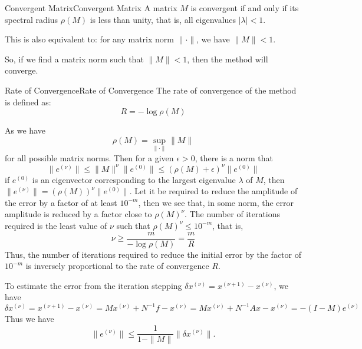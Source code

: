 \documentclass[../main.tex]{subfiles}
\begin{document}
\begin{theorem}{Convergent Matrix}{Convergent Matrix}
	A matrix $M$ is convergent if and only if its spectral radius $\rho(M)$ is less than unity, that is, all eigenvalues $|\lambda| < 1$.

	This is also equivalent to: for any matrix norm $\| \cdot \|$, we have $\| M \| < 1$.
\end{theorem}
So, if we find a matrix norm such that $\| M \| < 1$, then the method will converge.

\begin{definition}{Rate of Convergence}{Rate of Convergence}
	The rate of convergence of the method is defined as:
	\begin{equation}
		R = - \log \rho(M)
	\end{equation}
\end{definition}

As we have
\begin{equation*}
	\rho(M) = \sup_{\|\cdot \|} \| M \|
\end{equation*}
for all possible matrix norms. Then for a given $\epsilon > 0$, there is a norm that
\begin{equation*}
	\| e^{(\nu)} \| \leq \| M \|^{\nu} \| e^{(0)} \| \leq (\rho(M) + \epsilon)^{\nu} \| e^{(0)} \|
\end{equation*}
if $e^{(0)}$ is an eigenvector corresponding to the largest eigenvalue $\lambda$ of $M$, then $\| e^{(\nu)} \| = (\rho(M))^{\nu} \| e^{(0)} \|$. Let it be required to reduce the amplitude of the error by a factor of at least $10^{-m}$, then we see that, in some norm, the error amplitude is reduced by a factor close to $\rho(M)^\nu$. The number of iterations required is the least value of $\nu$ such that $\rho(M)^\nu \leq 10^{-m}$, that is,
\begin{equation}
	\nu \geq \frac{m}{-\log \rho(M)} = \frac{m}{R}
\end{equation}
Thus, the number of iterations required to reduce the initial error by the factor of $10^{-m}$ is inversely proportional to the rate of convergence $R$.

To estimate the error from the iteration stepping $ \delta x^{(\nu)} = x^{(\nu+1)} - x^{(\nu)}$, we have
\begin{equation*}
	\delta x^{(\nu)} = x^{(\nu+1)} - x^{(\nu)} = M x^{(\nu)} + N^{-1} f - x^{(\nu)} = M x^{(\nu)} + N^{-1} A x - x^{(\nu)} = -(I - M) e^{(\nu)}
\end{equation*}
Thus we have
\begin{equation*}
	\| e^{(\nu)} \| \leq \frac{1}{1 - \| M \|} \| \delta x^{(\nu)} \|.
\end{equation*}
\end{document}
